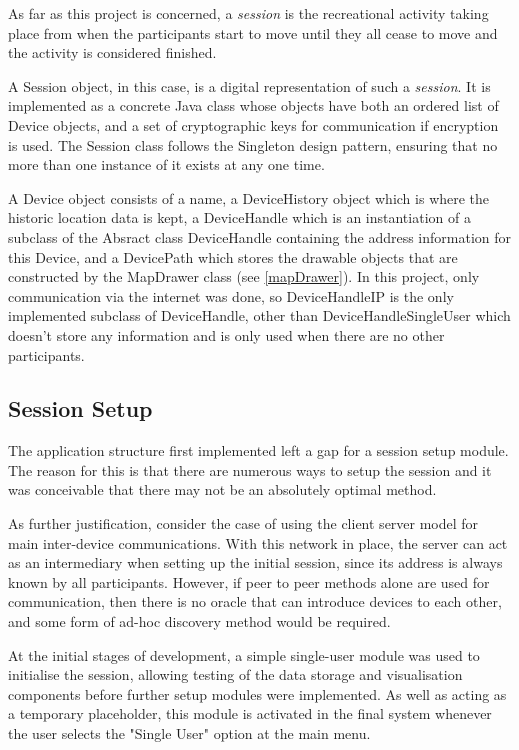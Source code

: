 As far as this project is concerned, a \emph{session} is the recreational activity taking place from when the participants start to move until they all cease to move and the activity is considered finished.

A Session object, in this case, is a digital representation of such a \emph{session}. It is implemented as a concrete Java class whose objects have both an ordered list of Device objects, and a set of cryptographic keys for communication if encryption is used. The Session class follows the Singleton design pattern, ensuring that no more than one instance of it exists at any one time.

A Device object consists of a name, a DeviceHistory object which is where the historic location data is kept, a DeviceHandle which is an instantiation of a subclass of the Absract class DeviceHandle containing the address information for this Device, and a DevicePath which stores the drawable objects that are constructed by the MapDrawer class (see \ref{mapDrawer}).
In this project, only communication via the internet was done, so DeviceHandleIP is the only implemented subclass of DeviceHandle, other than DeviceHandleSingleUser which doesn't store any information and is only used when there are no other participants.

\subsection{Session Setup}

The application structure first implemented left a gap for a session setup module. The reason for this is that there are numerous ways to setup the session and it was conceivable that there may not be an absolutely optimal method.

As further justification, consider the case of using the client server model for main inter-device communications. With this network in place, the server can act as an intermediary when setting up the initial session, since its address is always known by all participants. However, if peer to peer methods alone are used for communication, then there is no oracle that can introduce devices to each other, and some form of ad-hoc discovery method would be required.

At the initial stages of development, a simple single-user module was used to initialise the session, allowing testing of the data storage and visualisation components before further setup modules were implemented. As well as acting as a temporary placeholder, this module is activated in the final system whenever the user selects the "Single User" option at the main menu.

